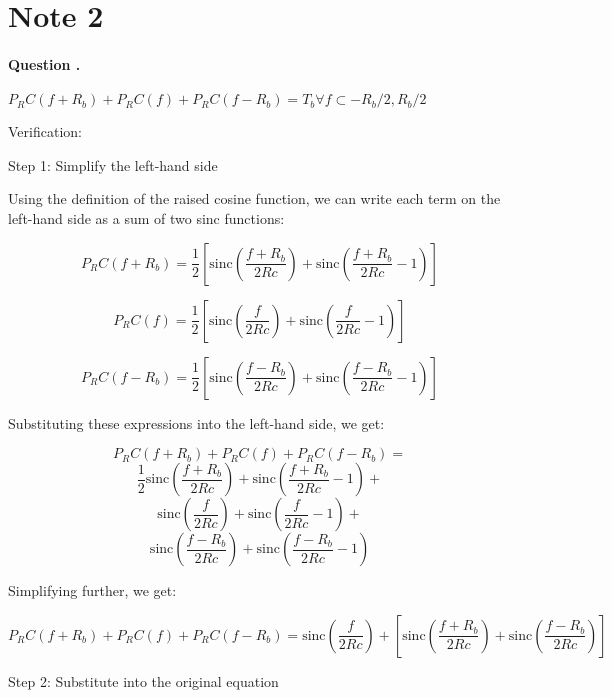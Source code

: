\documentclass[14pt,a4paper]{report}
\newcounter{question}
\newcommand*\question{%
\stepcounter{question}%
\paragraph{Question \thesection.\thequestion}}
\begin{document}
\section{Note 2}
\question
{
    $P_RC (f + R_b ) + P_RC (f ) + P_RC (f - R_b ) = T_b \forall f \subset -R_b /2, R_b /2$
}

\begin{answer_box*}
    
Verification:

Step 1: Simplify the left-hand side

Using the definition of the raised cosine function, we can write each term on the left-hand side as a sum of two sinc functions:

\begin{equation}
    P_RC (f + R_b ) = \frac{1}{2}\left[\text{sinc}\left(\frac{f + R_b }{2Rc}\right) + \text{sinc}\left(\frac{f + R_b }{2Rc} - 1\right)\right]
\end{equation}

\begin{equation}
    P_RC (f ) = \frac{1}{2}\left[\text{sinc}\left(\frac{f }{2Rc}\right) + \text{sinc}\left(\frac{f }{2Rc} - 1\right)\right]
\end{equation}


\begin{equation}
    P_RC (f - R_b ) = \frac{1}{2}\left[\text{sinc}\left(\frac{f - R_b }{2Rc}\right) + \text{sinc}\left(\frac{f - R_b }{2Rc} - 1\right)\right]
\end{equation}


Substituting these expressions into the left-hand side, we get:

        $$P_RC (f +R_b ) + P_RC (f ) + P_RC (f -R_b ) =$$
        $$\frac{1}{2}\text{sinc}\left(\frac{f +R_b }{2Rc}\right) + \text{sinc}\left(\frac{f +R_b }{2Rc} - 1\right) + $$ 
        $$\text{sinc}\left(\frac{f }{2Rc}\right) + \text{sinc}\left(\frac{f }{2Rc} - 1\right) + $$
        $$\text{sinc}\left(\frac{f - R_b }{2Rc}\right) + \text{sinc}\left(\frac{f - R_b }{2Rc} - 1\right)    $$

Simplifying further, we get:

\begin{equation}
    P_RC (f +R_b ) + P_RC (f ) + P_RC (f -R_b ) = 
    \text{sinc}\left(\frac{f }{2Rc}\right) + \left[\text{sinc}\left(\frac{f +R_b }{2Rc}\right) + \text{sinc}\left(\frac{f -R_b }{2Rc}\right)\right]
\end{equation}


Step 2: Substitute into the original equation


\end{answer_box*}
\end{document}
